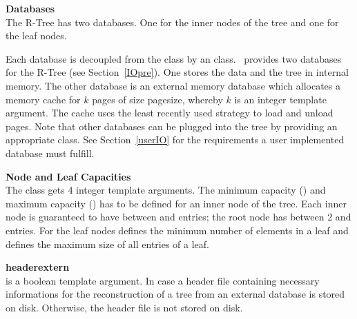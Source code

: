\noindent
{\bf Databases}\\
\noindent
The R-Tree has two databases. One for the inner nodes of the tree
and one for the leaf nodes. 

Each database is decoupled from the  class
 by an  
class. %
\cgal\ provides two databases for the R-Tree (see
Section~\ref{IOpre}). 
One stores the data and the tree in
internal memory. 
The other database  is an external memory database which
allocates a memory cache for $k$ pages of size pagesize, whereby $k$ is an
integer template argument. The cache uses the least recently used
strategy to load and unload pages. Note that other
databases  
can be plugged into the tree by providing an appropriate 
class. See Section~\ref{userIO} for the requirements a user
implemented database must fulfill.
\medskip

\noindent
{\bf Node and Leaf Capacities}\\
\noindent
The  class gets 4 integer template arguments.
The  minimum
capacity () and
maximum capacity () has to be defined for
an inner node of the tree.
Each inner node is guaranteed to have between  and
  entries; the root node has between 2 and
 entries. 
For the leaf nodes  defines the minimum
number of elements in a leaf and  defines the maximum size of
all  entries of a leaf.
\medskip

\noindent
{\bf headerextern}\\
\noindent
{} is a boolean template argument.
In case 
  a header file containing necessary informations for the
  reconstruction of a tree from an external database is stored on
  disk. Otherwise, the header file is not stored on disk.

